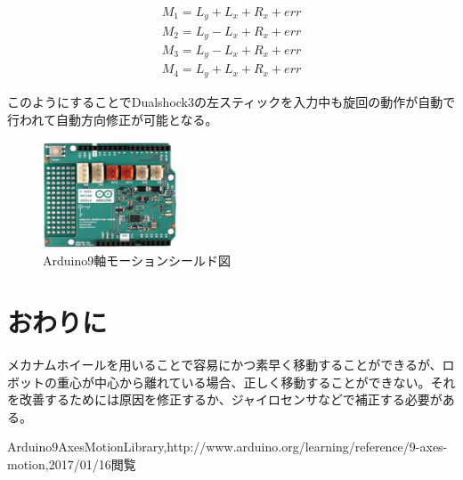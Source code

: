 \documentclass[twocolumn,11pt]{sotsuken_abst}
\begin{document}
\begin{eqnarray}
M_1 = L_y + L_x + R_x + err
\\
M_2 = L_y - L_x + R_x + err
\\
M_3 = L_y - L_x + R_x + err
\\
M_4 = L_y + L_x + R_x + err
\end{eqnarray}

このようにすることでDualshock3の左スティックを入力中も旋回の動作が自動で行われて自動方向修正が可能となる。


\begin{figure}[htp]
	\begin{center}
		\includegraphics[width=40mm]{Image/Arduino9軸モーションシールド図.png}
		\caption{Arduino9軸モーションシールド図}
		\label{Arduino9軸モーションシールド図}
	\end{center}
\end{figure}

\section{おわりに}
メカナムホイールを用いることで容易にかつ素早く移動することができるが、ロボットの重心が中心から離れている場合、正しく移動することができない。それを改善するためには原因を修正するか、ジャイロセンサなどで補正する必要がある。

\begin{thebibliography}{1}
 Arduino9AxesMotionLibrary,http:{\slash}{\slash}www.arduino.org{\slash}learning{\slash}reference{\slash}9-axes-motion,2017{\slash}01{\slash}16閲覧
\end{thebibliography}

\end{document}
